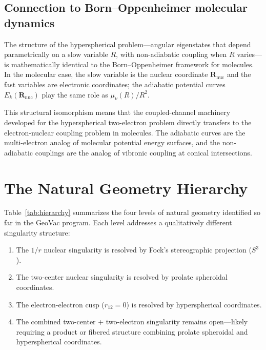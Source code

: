 \documentclass[aps,pra,twocolumn,superscriptaddress,longbibliography]{revtex4-2}
\begin{document}
\subsection{Connection to Born--Oppenheimer molecular dynamics}

The structure of the hyperspherical problem---angular eigenstates
that depend parametrically on a slow variable $R$, with
non-adiabatic coupling when $R$ varies---is mathematically identical
to the Born--Oppenheimer framework for molecules.  In the molecular
case, the slow variable is the nuclear coordinate $\bm{R}_{\mathrm{nuc}}$
and the fast variables are electronic coordinates; the adiabatic
potential curves $E_k(\bm{R}_{\mathrm{nuc}})$ play the same role as
$\mu_\nu(R)/R^2$.

This structural isomorphism means that the coupled-channel machinery
developed for the hyperspherical two-electron problem directly
transfers to the electron-nuclear coupling problem in molecules.
The adiabatic curves are the multi-electron analog of molecular
potential energy surfaces, and the non-adiabatic couplings are the
analog of vibronic coupling at conical intersections.


\section{The Natural Geometry Hierarchy}
\label{sec:hierarchy}

Table~\ref{tab:hierarchy} summarizes the four levels of natural
geometry identified so far in the GeoVac program.  Each level
addresses a qualitatively different singularity structure:

\begin{enumerate}
  \item The $1/r$ nuclear singularity is resolved by Fock's
    stereographic projection ($S^3$).
  \item The two-center nuclear singularity is resolved by prolate
    spheroidal coordinates.
  \item The electron-electron cusp ($r_{12} = 0$) is resolved by
    hyperspherical coordinates.
  \item The combined two-center + two-electron singularity remains
    open---likely requiring a product or fibered structure combining
    prolate spheroidal and hyperspherical coordinates.
\end{enumerate}
\end{document}
